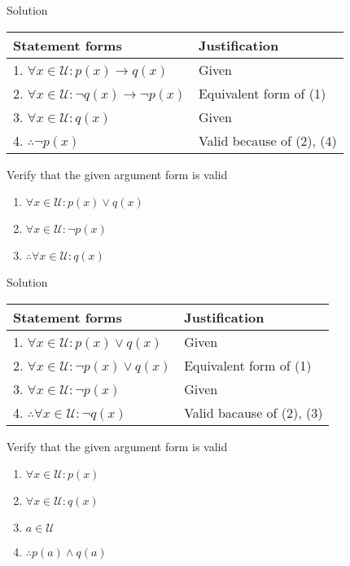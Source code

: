 Solution
\begin{table}[hbt!]
    \centering
    \begin{tabular}{|l | l|} 
    \hline
    Statement forms & Justification\\ [0.5ex] 
    \hline
        1. $\forall x \in \mathcal U: p(x) \rightarrow q(x)$ & Given \\
        2. $\forall x \in \mathcal U: \neg q(x) \rightarrow \neg p(x)$ & Equivalent form of (1) \\
        3. $\forall x \in \mathcal U: q(x)$ & Given \\
        4. $\therefore \neg p(x)$ & Valid because of (2), (4) \\
    \hline
    \end{tabular}
\end{table}

\begin{longfbox}
    \begin{bt} \label{pro:practice2.32}
        Verify that the given argument form is valid
        \begin{enumerate}
            \item[] $\forall x \in \mathcal U: p(x) \lor q(x)$
            \item[] $\forall x \in \mathcal U: \neg p(x)$
            \item[] $\therefore \forall x \in \mathcal U: q(x)$
        \end{enumerate}
    \end{bt}
\end{longfbox}

Solution
\begin{table}[hbt!]
    \centering
    \begin{tabular}{|l | l|} 
    \hline
    Statement forms & Justification\\ [0.5ex] 
    \hline
        1. $\forall x \in \mathcal U: p(x) \lor q(x)$ & Given \\
        2. $\forall x \in \mathcal U: \neg p(x) \lor q(x)$ & Equivalent form of (1) \\
        3. $\forall x \in \mathcal U: \neg p(x)$ & Given \\
        4. $\therefore \forall x \in \mathcal U: \neg q(x)$ & Valid bacause of (2), (3) \\
    \hline
    \end{tabular}
\end{table}

\newpage
\begin{longfbox}
    \begin{bt} \label{pro:practice2.33}
        Verify that the given argument form is valid
        \begin{enumerate}
            \item[] $\forall x \in \mathcal U: p(x)$
            \item[] $\forall x \in \mathcal U: q(x)$
            \item[] $a \in \mathcal U$
            \item[] $\therefore p(a) \land q(a)$
        \end{enumerate}
    \end{bt}
\end{longfbox}

